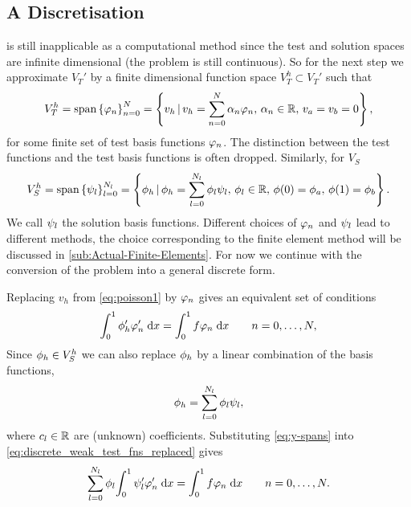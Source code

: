 \subsection{A Discretisation}

 is still inapplicable as a computational method since the test and solution spaces are infinite dimensional (\ie the problem is still continuous).
So for the next step we approximate $V_{T}'$ by a finite dimensional function space $V_{T}^{h}\subset V_{T}'$ such that
\begin{equation}
  V_{T}^{h}=\text{span} \left\{ { \varphi_{n} } \right\}_{n=0}^{N}
  = \left\{ {v_h \,|\, v_h = \sum_{n=0}^{N}\alpha_{n} \varphi_{n},\, \alpha_{n} \in \mathbb{R},\,
    v_a = v_b =0 } \right\},
  \label{eq:30}
\end{equation}
for some finite set of test basis functions $\varphi_{n}$.
The distinction between the test functions and the test basis functions is often dropped.
Similarly, for $V_S$
\begin{equation}
  \label{eq:34}
  V_{S}^{h}=\text{span} \left\{ { \psi_{l} } \right\}_{l=0}^{N_l}
  = \left\{ {\phi_h \,|\, \phi_h = \sum_{l=0}^{N_l}\phi_{l} \psi_{l},\, \phi_{l} \in \mathbb{R},\,
    \phi(0) = \phi_a,\, \phi(1) = \phi_b } \right\}.
\end{equation}
We call $\psi_l$ the solution basis functions.
Different choices of $\varphi_{n}$ and $\psi_l$ lead to different methods, the choice corresponding to the finite element method will be discussed in \cref{sub:Actual-Finite-Elements}.
For now we continue with the conversion of the problem into a general discrete form.

Replacing $v_{h}$ from \cref{eq:poisson1} by $\varphi_{n}$ gives an equivalent set of conditions
\begin{equation}
  {\int_0^1   \phi'_{h} \varphi_{n}'   {\; \mathrm{{d}}}{x}}  = {\int_0^1  f\varphi_{n}  {\; \mathrm{{d}}}{x}} \qquad n=0,\ldots,N,
  \label{eq:discrete_weak_test_fns_replaced}
\end{equation}
Since $\phi_{h}\in V_{S}^{h}$ we can also replace $\phi_{h}$ by a linear combination of the basis functions, \ie
\begin{equation}
  \phi_{h}=\sum_{l=0}^{N_l} \phi_{l}\psi_{l},
  \label{eq:y-spans}
\end{equation}
where $c_l \in \mathbb{R}$ are (unknown) coefficients.
Substituting \cref{eq:y-spans} into \cref{eq:discrete_weak_test_fns_replaced} gives
\begin{equation}
  \sum_{l=0}^{N_l} \phi_{l}{\int_0^1  \psi_{l}'\varphi'_{n}  {\; \mathrm{{d}}}{x}} ={\int_0^1  f\varphi_{n}  {\; \mathrm{{d}}}{x}} 
  \qquad n=0,\ldots,N.
  \label{eq:31}
\end{equation}

